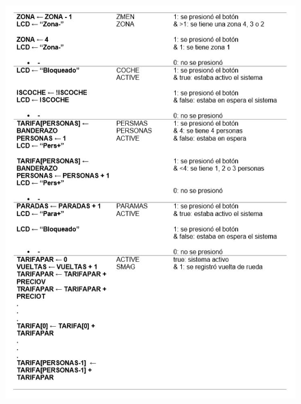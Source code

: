 \documentclass[a4paper,11pt]{article}
\begin{document}
\begin{figure}[h]
	\centering
	\includegraphics{images/tabla2.jpg}
	\end{figure}
\end{document}
